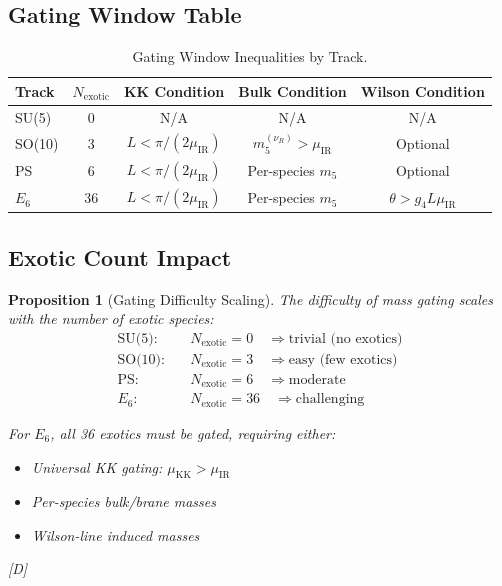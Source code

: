 \documentclass[11pt,a4paper]{article}
\newtheorem{proposition}[theorem]{Proposition}
\newcommand{\tagD}{\textcolor{blue!70!black}{[D]}}
\begin{document}
\subsection{Gating Window Table}

\begin{table}[h]
\centering
\caption{Gating Window Inequalities by Track.}
\label{tab:gating-window}
\begin{tabular}{lcccc}
\toprule
Track & $N_{\text{exotic}}$ & KK Condition & Bulk Condition & Wilson Condition \\
\midrule
SU(5) & 0 & N/A & N/A & N/A \\
SO(10) & 3 & $L < \pi/(2\mu_{\text{IR}})$ & $m_5^{(\nu_R)} > \mu_{\text{IR}}$ & Optional \\
PS & 6 & $L < \pi/(2\mu_{\text{IR}})$ & Per-species $m_5$ & Optional \\
$E_6$ & 36 & $L < \pi/(2\mu_{\text{IR}})$ & Per-species $m_5$ & $\theta > g_4 L \mu_{\text{IR}}$ \\
\bottomrule
\end{tabular}
\end{table}

\subsection{Exotic Count Impact}

\begin{proposition}[Gating Difficulty Scaling]
\label{prop:gating-difficulty}
The difficulty of mass gating scales with the number of exotic species:
\begin{align}
\label{eq:gating-su5}
\text{SU(5):} \quad & N_{\text{exotic}} = 0 \quad \Rightarrow \text{trivial (no exotics)} \\
\label{eq:gating-so10}
\text{SO(10):} \quad & N_{\text{exotic}} = 3 \quad \Rightarrow \text{easy (few exotics)} \\
\label{eq:gating-ps}
\text{PS:} \quad & N_{\text{exotic}} = 6 \quad \Rightarrow \text{moderate} \\
\label{eq:gating-e6}
E_6: \quad & N_{\text{exotic}} = 36 \quad \Rightarrow \text{challenging}
\end{align}

For $E_6$, all 36 exotics must be gated, requiring either:
\begin{itemize}
    \item Universal KK gating: $\mu_{\text{KK}} > \mu_{\text{IR}}$
    \item Per-species bulk/brane masses
    \item Wilson-line induced masses
\end{itemize}
\tagD
\end{proposition}
\end{document}
